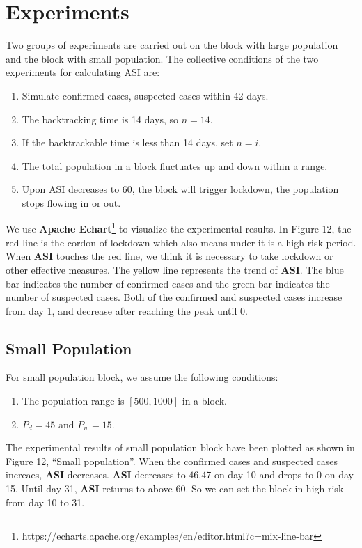 \documentclass[sigplan,screen]{acmart}
\begin{document}
\section{Experiments}
Two groups of experiments are carried out on the block with large population and the block with small population.
The collective conditions of the two experiments for calculating ASI are:
\begin{enumerate}
	\item Simulate confirmed cases, suspected cases within 42 days.
	\item The backtracking time is 14 days, so $n=14$.
	\item If the backtrackable time is less than 14 days, set $n=i$.
	\item The total population in a block fluctuates up and down within a range.
	\item Upon ASI decreases to 60, the block will trigger lockdown, the population stops flowing in or out.
\end{enumerate}
We use \textbf{Apache Echart}\footnote{https://echarts.apache.org/examples/en/editor.html?c=mix-line-bar} to visualize the experimental results.
In Figure 12, the red line is the cordon of lockdown which also means under it is a high-risk period.
When \textbf{ASI} touches the red line, we think it is necessary to take lockdown or other effective measures.
The yellow line represents the trend of \textbf{ASI}.
The blue bar indicates the number of confirmed cases and the green bar indicates the number of suspected cases.
Both of the confirmed and suspected cases increase from day 1, and decrease after reaching the peak until 0.

\subsection{Small Population}
For small population block, we assume the following conditions:
\begin{enumerate}
	\item The population range is $[500,1000]$ in a block.
	\item $P_d=45$ and $P_w=15$.
\end{enumerate}
The experimental results of small population block have been plotted as shown in Figure 12, ``Small population''.
When the confirmed cases and suspected cases increaes, \textbf{ASI} decreases.
\textbf{ASI} decreases to $46.47$ on day 10 and drops to $0$ on day 15.
Until day 31, \textbf{ASI} returns to above 60.
So we can set the block in high-risk from day 10 to 31.
\end{document}
